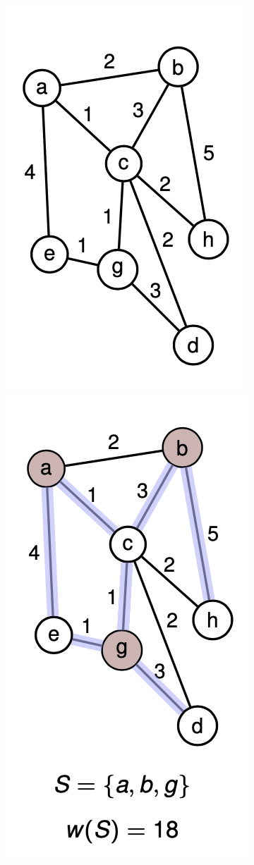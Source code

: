 \documentclass[letterpaper]{article}
\begin{document}
\begin{figure}[!h]
	\centering
	\begin{minipage}[t]{4cm}
		\centering
		\includegraphics[scale=0.5]{1.png}
	\end{minipage}
	\hspace{3cm}
	\begin{minipage}[t]{4cm}
		\centering
		\includegraphics[scale=0.5]{2.png}

\end{minipage}
\end{figure}
\end{document}
